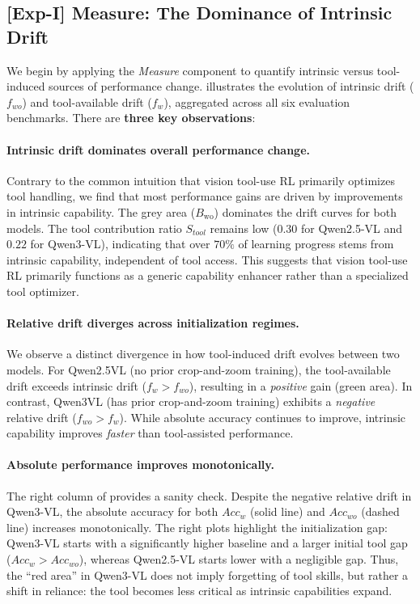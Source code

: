 \subsection{[Exp-I] Measure: The Dominance of Intrinsic Drift}
\label{sec:exp_measure}
%
We begin by applying the \textit{Measure} component to quantify intrinsic versus tool-induced sources of performance change.
%
 illustrates the evolution of intrinsic drift ($f_{wo}$) and tool-available drift ($f_{w}$), aggregated across all six evaluation benchmarks.
%
There are \textbf{three key observations}:
%
\paragraph{Intrinsic drift dominates overall performance change.}
%
Contrary to the common intuition that vision tool-use RL primarily optimizes tool handling, we find that most performance gains are driven by improvements in intrinsic capability.
%
The grey area ($B_\mathrm{wo}$) dominates the drift curves for both models.
%
The tool contribution ratio $S_{tool}$ remains low ($0.30$ for Qwen2.5-VL and $0.22$ for Qwen3-VL), indicating that over $70\%$ of learning progress stems from intrinsic capability, independent of tool access.
%
This suggests that vision tool-use RL primarily functions as a generic capability enhancer rather than a specialized tool optimizer.

\paragraph{Relative drift diverges across initialization regimes.}
%
We observe a distinct divergence in how tool-induced drift evolves between two models.
%
For Qwen2.5VL (no prior crop-and-zoom training), the tool-available drift exceeds intrinsic drift ($f_w > f_{wo}$), resulting in a \textit{positive} gain (green area).
%
In contrast, Qwen3VL (has prior
crop-and-zoom training) exhibits a \textit{negative} relative drift ($f_{wo} > f_w$).
%
While absolute accuracy continues to improve, intrinsic capability improves \textit{faster} than tool-assisted performance.
%

\paragraph{Absolute performance improves monotonically.}
%
The right column of  provides a sanity check.
%
Despite the negative relative drift in Qwen3-VL, the absolute accuracy for both $Acc_{w}$ (solid line) and $Acc_{wo}$ (dashed line) increases monotonically.
%
The right plots highlight the initialization gap: Qwen3-VL starts with a significantly higher baseline and a larger initial tool gap ($Acc_w > Acc_{wo}$), whereas Qwen2.5-VL starts lower with a negligible gap.
%
Thus, the ``red area'' in Qwen3-VL does not imply forgetting of tool skills, but rather a shift in reliance: the tool becomes less critical as intrinsic capabilities expand.

